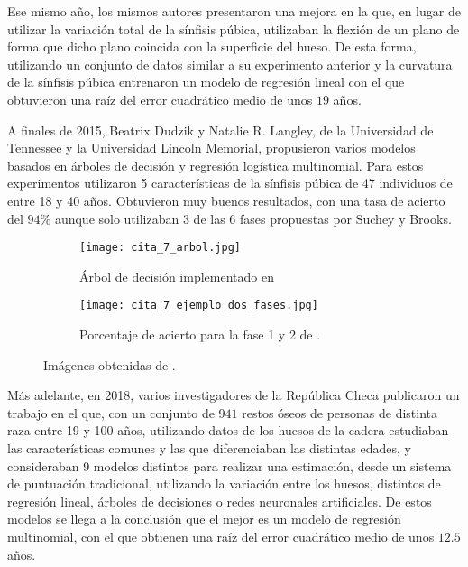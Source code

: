 Ese mismo año, los mismos autores presentaron una mejora \cite{mejoraModelandoHuesos3D} en la que, en lugar de utilizar la variación total de la sínfisis púbica, utilizaban la flexión de un plano de forma que dicho plano coincida con la superficie del hueso. De esta forma, utilizando un conjunto de datos similar a su experimento anterior y la curvatura de la sínfisis púbica entrenaron un modelo de regresión lineal con el que obtuvieron una raíz del error cuadrático medio de unos $19$ años.

A finales de 2015, Beatrix Dudzik y Natalie R. Langley, de la Universidad de Tennessee y la Universidad Lincoln Memorial, propusieron \cite{componentBased} varios modelos basados en árboles de decisión y regresión logística multinomial. Para estos experimentos utilizaron 5 características de la sínfisis púbica de 47 individuos de entre 18 y 40 años. Obtuvieron muy buenos resultados, con una tasa de acierto del $94\%$ aunque solo utilizaban 3 de las 6 fases propuestas por Suchey y Brooks.

\begin{figure}[H]
	\centering
	\begin{subfigure}{.5\textwidth}
	  \centering
	  \texttt{[image: cita\_7\_arbol.jpg]}
	  \caption{Árbol de decisión implementado en \cite{componentBased}}
	  \label{fig:arbol_c7}
	\end{subfigure}%
	\begin{subfigure}{.5\textwidth}
	  \centering
	  \texttt{[image: cita\_7\_ejemplo\_dos\_fases.jpg]}
	  \caption{Porcentaje de acierto para la fase 1 y 2 de \cite{componentBased}.}
	  \label{fig:acierto_cita7}
	\end{subfigure}
	\caption{Imágenes obtenidas de \cite{componentBased}.}
	\label{fig:arboles_cita7}
\end{figure}



Más adelante, en 2018, varios investigadores de la República Checa publicaron un trabajo \cite{estimacionHuesosCadera} en el que, con un conjunto de $941$ restos óseos de personas de distinta raza entre 19 y 100 años, utilizando datos de los huesos de la cadera estudiaban las características comunes y las que diferenciaban las distintas edades, y consideraban 9 modelos distintos para realizar una estimación, desde un sistema de puntuación tradicional, utilizando la variación entre los huesos, distintos de regresión lineal, árboles de decisiones o redes neuronales artificiales. De estos modelos se llega a la conclusión que el mejor es un modelo de regresión multinomial, con el que obtienen una raíz del error cuadrático medio de unos $12.5$ años.

